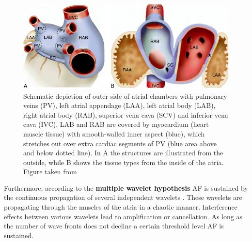 \vspace*{-0.5cm}
\begin{figure}[H]
\begin{center}
\includegraphics[scale=3.5]{./teile/introduction/PVatriumTissue.png}
\caption{Schematic depiction of outer side of atrial chambers with pulmonary veins (PV), left atrial appendage (LAA), left atrial body (LAB), 
right atrial body (RAB), superior vena cava (SCV) and inferior vena cava (IVC). LAB and RAB are covered by myocardium (heart muscle tissue) 
with smooth-walled inner aspect (blue), which stretches out over extra cardiac segments of PV (blue area above and below dotted line). 
In A the structures are illustrated from the outside, while B shows the tissue types from the inside of the atria. Figure 
taken from \cite{Doug06}}
\label{walls}
\end{center}
\end{figure}

\vspace*{-0.6cm}
Furthermore, according to the \textbf{multiple wavelet hypothesis} AF is sustained by the continuous propagation of several independent 
wavelets \cite{CE09}. These wavelets are propagating through the muscles of the atria in a chaotic manner. Interference effects between 
various wavelets lead to amplification or cancellation. As long as the number of wave fronts does not decline a certain threshold level AF 
is sustained.\newline


